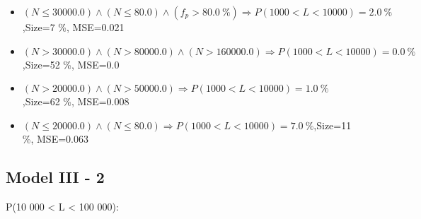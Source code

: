 \documentclass[numbered]{CSL}
\begin{document}
\begin{itemize}
\item $(N \leq 30000.0) \land (N \leq 80.0) \land (f_p > 80.0~\%) \Rightarrow P(1 000 < L < 10 000) = 2.0~\%$,\hfill Size=7 \%, MSE=0.021
\item $(N > 30000.0) \land (N > 80000.0) \land (N > 160000.0) \Rightarrow P(1 000 < L < 10 000) = 0.0~\%$,\hfill Size=52 \%, MSE=0.0
\item $(N > 20000.0) \land (N > 50000.0) \Rightarrow P(1 000 < L < 10 000) = 1.0~\%$,\hfill Size=62 \%, MSE=0.008
\item $(N \leq 20000.0) \land (N \leq 80.0) \Rightarrow P(1 000 < L < 10 000) = 7.0~\%$,\hfill Size=11 \%, MSE=0.063
\end{itemize}

\subsection{Model III - 2}
P(10 000 < L < 100 000):
\end{document}
